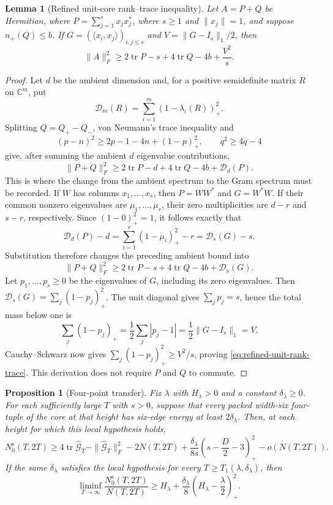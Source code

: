 \documentclass[11pt,reqno]{amsart}
\newtheorem{proposition}[theorem]{Proposition}
\newtheorem{lemma}[theorem]{Lemma}
\theoremstyle{definition}
\theoremstyle{remark}
\newcommand{\pos}[1]{(#1)_{+}}
\DeclareMathOperator{\tr}{tr}
\begin{document}
\begin{lemma}[Refined unit-core rank--trace inequality]
\label{lem:refined-rank-trace}
Let $A=P+Q$ be Hermitian, where
$P=\sum_{j=1}^s x_jx_j^*$, where $s\ge1$ and $\|x_j\|=1$, and suppose
$n_+(Q)\le b$.  If $G=(\langle x_i,x_j\rangle)_{i,j\le s}$ and
$V=\|G-I_s\|_1/2$, then
\begin{equation}\label{eq:refined-unit-rank-trace}
 \|A\|_F^2\ge
 2\tr P-s+4\tr Q-4b+\frac{V^2}{s}.
\end{equation}
\end{lemma}

\begin{proof}
Let $d$ be the ambient dimension and, for a positive semidefinite matrix
$R$ on $\mathbb C^m$, put
\[
 \mathcal D_m(R)=\sum_{i=1}^m(1-\lambda_i(R))_+^2.
\]
Splitting $Q=Q_+-Q_-$, von Neumann's trace inequality and
\[
 (p-n)^2\ge2p-1-4n+(1-p)_+^2,
 \qquad q^2\ge4q-4
\]
give, after summing the ambient $d$ eigenvalue contributions,
\[
 \|P+Q\|_F^2\ge
 2\tr P-d+4\tr Q-4b+\mathcal D_d(P).
\]
This is where the change from the ambient spectrum to the Gram spectrum must
be recorded.  If $W$ has columns $x_1,\ldots,x_s$, then
$P=WW^*$ and $G=W^*W$.  If their common nonzero eigenvalues are
$\mu_1,\ldots,\mu_r$, their zero multiplicities are $d-r$ and $s-r$,
respectively.  Since $(1-0)_+^2=1$, it follows exactly that
\[
 \mathcal D_d(P)-d
 =\sum_{i=1}^r(1-\mu_i)_+^2-r
 =\mathcal D_s(G)-s.
\]
Substitution therefore changes the preceding ambient bound into
\[
 \|P+Q\|_F^2\ge
 2\tr P-s+4\tr Q-4b+\mathcal D_s(G).
\]
Let $p_1,\ldots,p_s\ge0$ be the eigenvalues of $G$, including its zero
eigenvalues.  Then $\mathcal D_s(G)=\sum_j(1-p_j)_+^2$.
The unit diagonal gives $\sum_jp_j=s$, hence the total mass below one is
\[
 \sum_j(1-p_j)_+=\frac12\sum_j|p_j-1|
 =\frac12\|G-I_s\|_1=V.
\]
Cauchy--Schwarz now gives
$\sum_j(1-p_j)_+^2\ge V^2/s$, proving
\eqref{eq:refined-unit-rank-trace}.  This derivation does not require $P$
and $Q$ to commute.
\end{proof}

\begin{proposition}[Four-point transfer]\label{prop:transfer}
Fix $\lambda$ with $H_\lambda>0$ and a constant $\delta_\lambda\ge0$.
For each sufficiently large $T$ with $s>0$, suppose that every packed
width-six four-tuple of the core at that height has six-edge energy at least
$2\delta_\lambda$.  Then, at each height for which this local hypothesis
holds,
\begin{equation}\label{eq:four-defect}
 N_0^{\mathrm s}(T,2T)\ge
 4\tr\widehat{\mathcal G}_T-
 \|\widehat{\mathcal G}_T\|_F^2-2N(T,2T)
 +\frac{\delta_\lambda}{8s}
   \pos{s-\frac D2-3}^{2}-o(N(T,2T)).
\end{equation}
If the same $\delta_\lambda$ satisfies the local hypothesis for every
$T\ge T_1(\lambda,\delta_\lambda)$, then
\begin{equation}\label{eq:fixed-lambda-form}
 \liminf_{T\to\infty}\frac{N_0^{\mathrm{s}}(T,2T)}{N(T,2T)}
 \ge H_\lambda+
 \frac{\delta_\lambda}{8}
 \pos{H_\lambda-\frac\lambda2}^{2}.
\end{equation}
\end{proposition}
\end{document}
